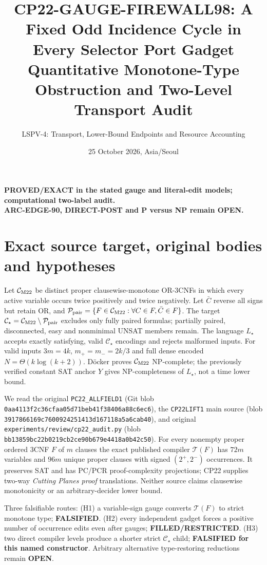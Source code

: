 \documentclass[11pt]{article}
\title{CP22-GAUGE-FIREWALL98: A Fixed Odd Incidence Cycle in Every Selector Port Gadget\\
\large Quantitative Monotone-Type Obstruction and Two-Level Transport Audit}
\author{LSPV-4: Transport, Lower-Bound Endpoints and Resource Accounting}
\date{25 October 2026, Asia/Seoul}
\begin{document}
\maketitle
\begin{center}
\textbf{PROVED/EXACT in the stated gauge and literal-edit models; computational two-label audit.}\\
\textbf{ARC-EDGE-90, DIRECT-POST and P versus NP remain OPEN.}
\end{center}

\section{Exact source target, original bodies and hypotheses}
Let $\mathcal C_{\rm M22}$ be distinct proper clausewise-monotone OR-3CNFs in which every active variable occurs twice positively and twice negatively. Let $\bar C$ reverse all signs but retain OR, and $\mathcal P_{\rm pair}=\{F\in\mathcal C_{\rm M22}:\forall C\in F,\bar C\in F\}$. The target $\mathcal C_\star=\mathcal C_{\rm M22}\setminus\mathcal P_{\rm pair}$ excludes only fully paired formulas; partially paired, disconnected, easy and nonminimal UNSAT members remain. The language $L_\star$ accepts exactly satisfying, valid $\mathcal C_\star$ encodings and rejects malformed inputs. For valid inputs $3m=4k$, $m_+=m_-=2k/3$ and full dense encoded $N=\Theta(k\log(k+2))$. D\"ocker proves $\mathcal C_{\rm M22}$ NP-complete; the previously verified constant SAT anchor $Y$ gives NP-completeness of $L_\star$, not a time lower bound.

We read the original \texttt{PC22\_ALLFIELD1} (Git blob \texttt{0aa4113f2c36cfaa05d71beb41f38406a88c6ec6}), the \texttt{CP22LIFT1} main source (blob \texttt{3917866169c7600924251413d167118a5a6cab40}), and original \texttt{experiments/review/cp22\_audit.py} (blob \texttt{bb13859bc22b0219cb2ce90b679e4418a0b42c50}). For every nonempty proper ordered 3CNF $F$ of $m$ clauses the exact published compiler $\mathcal T(F)$ has $72m$ variables and $96m$ unique proper clauses with signed $(2^+,2^-)$ occurrences. It preserves SAT and has PC/PCR proof-complexity projections; CP22 supplies two-way \emph{Cutting Planes proof} translations. Neither source claims clausewise monotonicity or an arbitrary-decider lower bound.

Three falsifiable routes: (H1) a variable-sign gauge converts $\mathcal T(F)$ to strict monotone type; \textbf{FALSIFIED}. (H2) every independent gadget forces a positive number of occurrence edits even after gauges; \textbf{FILLED/RESTRICTED}. (H3) two direct compiler levels produce a shorter strict $\mathcal C_\star$ child; \textbf{FALSIFIED for this named constructor}. Arbitrary alternative type-restoring reductions remain \textbf{OPEN}.
\end{document}
